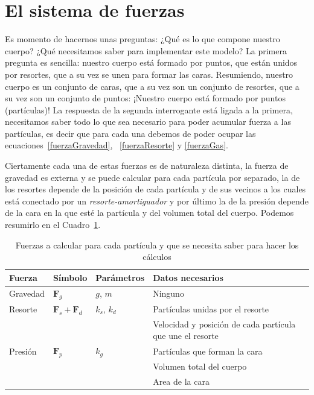 \section{El sistema de fuerzas}
Es momento de hacernos unas preguntas:
¿Qué es lo que compone nuestro cuerpo?
¿Qué necesitamos saber para implementar este modelo?
La primera pregunta es sencilla: nuestro cuerpo está formado por puntos, que están unidos por resortes, que a su vez se unen para formar las caras.
Resumiendo, nuestro cuerpo es un conjunto de caras, que a su vez son un conjunto de resortes, que a su vez son un conjunto de puntos:
¡Nuestro cuerpo está formado por puntos (partículas)!
La respuesta de la segunda interrogante está ligada a la primera, necesitamos saber todo lo que sea necesario para poder acumular fuerza a las partículas, es decir que para cada una debemos de poder ocupar las ecuaciones~\eqref{fuerzaGravedad}, ~\eqref{fuerzaResorte} y \eqref{fuerzaGas}.

Ciertamente cada una de estas fuerzas es de naturaleza distinta, la fuerza de gravedad es externa y se puede calcular para cada partícula por separado, la de los resortes depende de la posición de cada partícula y de sus vecinos a los cuales está conectado por un \emph{resorte-amortiguador} y por último la de la presión depende de la cara en la que esté la partícula y del volumen total del cuerpo.
Podemos resumirlo en el Cuadro~\ref{ejemplo:fuerzas}.

\begin{table}
\begin{center}
\begin{tabular} {@{}llll@{}} 
\toprule
Fuerza & Símbolo &  Parámetros & Datos necesarios \\ 
\midrule
Gravedad & $ \textbf{F}_g $ & $g$, $m$ & Ninguno \\
Resorte & $ \textbf{F}_s + \textbf{F}_d $ & $k_s$, $k_d$ & Partículas unidas por el resorte \\
& & & Velocidad y posición de cada partícula que une el resorte \\
Presión & $ \textbf{F}_p $ & $k_g$ & Partículas que forman la cara \\ 
& & & Volumen total del cuerpo \\ 
& & & Area de la cara \\ 
\bottomrule
\end{tabular}
\end{center}
\caption[Resumen de las fuerzas que actúan sobre cada partícula]{Fuerzas a calcular para cada partícula y que se necesita saber para hacer los cálculos}
\label{ejemplo:fuerzas}
\end{table}

